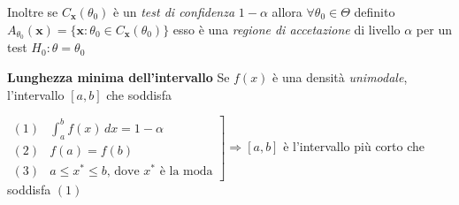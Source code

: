 \documentclass[openany]{book} %
\begin{document}
Inoltre se $C_{\boldsymbol{x}}(\theta_0)$ è un \textit{test di confidenza} $1-\alpha$ allora $\forall\theta_0\in\Theta$ definito $A_{\theta_0}(\boldsymbol{x})=\{\boldsymbol{x}:\theta_0\in C_{\boldsymbol{x}}(\theta_0)\}$ esso è una \textit{regione di accetazione} di livello $\alpha$ per un test $H_0:\theta=\theta_0$

\textbf{Lunghezza minima dell'intervallo} Se $f(x)$ è una densità \textit{unimodale}, l'intervallo $[a,b]$ che soddisfa 

$\left. \begin{array}{ll} 
(1) & \int_a^bf(x)\,dx=1-\alpha\\
(2) & f(a)=f(b)\\
(3) & a\leq x^*\leq b \text{, dove }x^* \text{ è la moda}	
\end{array}\right]
\Rightarrow [a,b]$ è l'intervallo più corto che soddisfa $(1)$




\end{document}

